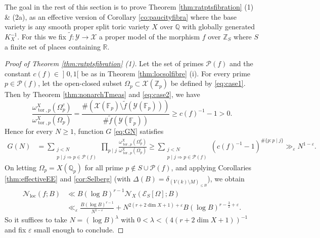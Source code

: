 \documentclass[11pt,letterpaper]{amsart}
\newcommand{\BF}{{\mathbb {F}}}
\newcommand{\BQ}{{\mathbb {Q}}}
\newcommand{\BR}{{\mathbb {R}}}
\newcommand{\BZ}{{\mathbb {Z}}}
\newcommand{\CE}{{\mathcal {E}}}
\newcommand{\CN}{{\mathcal {N}}}
\newcommand{\CP}{{\mathcal {P}}}
\newcommand{\CX}{{\mathcal {X}}}
\newcommand{\CY}{{\mathcal {Y}}}
\theoremstyle{plain}
\numberwithin{equation}{section}
\theoremstyle{definition}
\theoremstyle{remark}
\begin{document}
The goal in the rest of this section is to prove Theorem \ref{thm:ratptsfibration} (1) \& (2a),  as an effective version of Corollary \ref{co:paucityfibra} where the base variety is any smooth proper split toric variety $X$ over $\BQ$ with globally generated $K_X^{-1}$.  For this we fix  $\widetilde{f}:\CY\to \CX$ a proper model of the morphism $f$ over $\BZ_S$ where $S$ a finite set of places containing $\BR$.  
\begin{proof}[Proof of Theorem \ref{thm:ratptsfibration} (1)]	
 Let the set of primes $\CP(f)$ and the constant $c(f)\in\mathopen ]0,1[$ be as in Theorem \ref{thm:locsolfibre} (i).  For every prime $p\in\CP(f)$, let the open-closed subset $\Omega_p\subset\CX(\BZ_p)$ be defined by \eqref{eq:case1}.
Then by Theorem \ref{thm:nonarchTmeas} and \eqref{eq:case2}, we have
$$\frac{\omega_{\operatorname{tor},p}^X(\Omega_p^c)}{\omega_{\operatorname{tor},p}^X(\Omega_p)}=\frac{\#\left(\CX(\BF_p)\setminus \widetilde{f}(\CY(\BF_p))\right)}{\# \widetilde{f}(\CY(\BF_p))}\geqslant c(f)^{-1}-1>0.$$
Hence  for every $N\geqslant 1$,  function $G$ \eqref{eq:GN} satisfies
\begin{align*}
	G(N)&=\sum_{\substack{j<N\\p\mid j\Rightarrow p\in \CP(f)}}\prod_{p\mid j }\frac{\omega_{\operatorname{tor},p}^X(\Omega_p^c)}{\omega_{\operatorname{tor},p}^X(\Omega_p)}\geqslant \sum_{\substack{j<N\\p\mid j\Rightarrow p\in \CP(f)}}(c(f)^{-1}-1)^{\#\{p:p\mid j\}}\gg_{\varepsilon} N^{1-\varepsilon}.
\end{align*}
On letting $\Omega_p=X(\BQ_p)$ for all prime $p\notin S\cup \CP(f)$, and applying Corollaries \ref{thm:effectiveEE} and \ref{cor:Selberg} (with $\Delta(B)=\delta_{(V(k)\setminus M)_{\leqslant B}}$), we obtain 
\begin{align*}
	\CN_{\operatorname{loc}}(f;B)&\ll B(\log B)^{r-1}\CN_X(\CE_S[\Omega];B)\\ & \ll_\varepsilon \frac{B(\log B)^{r-1}}{N^{1-\varepsilon}}+N^{2(r+2\dim X+1)+\varepsilon}B(\log B)^{r-\frac{3}{2}+\varepsilon}.
\end{align*}
So it suffices to take $N=(\log B)^\lambda$ with $0<\lambda<(4(r+2\dim X+1))^{-1}$ and fix $\varepsilon$ small enough to conclude.
\end{proof}
\end{document}
